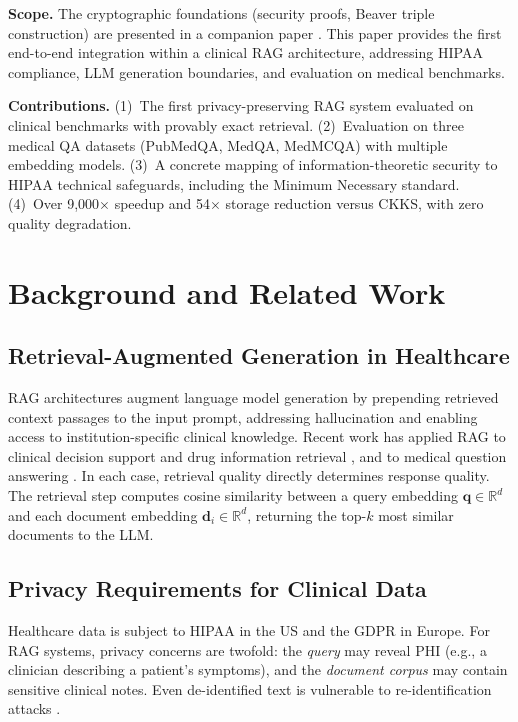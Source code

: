 \documentclass[conference]{IEEEtran}
\newcommand{\R}{\mathbb{R}}
\newcommand{\query}{\mathbf{q}}
\newcommand{\doc}{\mathbf{d}}
\begin{document}
\smallskip
\noindent\textbf{Scope.}
The cryptographic foundations (security proofs, Beaver triple construction)
are presented in a companion paper \cite{syed2026rpb}. This paper
provides the first end-to-end integration within a clinical RAG architecture,
addressing HIPAA compliance, LLM generation boundaries, and evaluation on
medical benchmarks.

\smallskip
\noindent\textbf{Contributions.}
(1)~The first privacy-preserving RAG system evaluated on clinical benchmarks
with provably exact retrieval.
(2)~Evaluation on three medical QA datasets (PubMedQA, MedQA, MedMCQA)
with multiple embedding models.
(3)~A concrete mapping of information-theoretic security to HIPAA technical
safeguards, including the Minimum Necessary standard.
(4)~Over 9{,}000$\times$ speedup and 54$\times$ storage reduction versus
CKKS, with zero quality degradation.


\section{Background and Related Work}
\label{sec:background}

\subsection{Retrieval-Augmented Generation in Healthcare}
\label{sec:bg_rag}

RAG architectures \cite{lewis2020rag} augment language model generation by
prepending retrieved context passages to the input prompt, addressing
hallucination and enabling access to institution-specific clinical knowledge.
Recent work has applied RAG to clinical decision support and drug
information retrieval \cite{zakka2024almanac}, and to medical question
answering
\cite{xiong2024benchmarking_medical_rag}. In each case, retrieval quality
directly determines response quality.
The retrieval step computes cosine similarity between a query embedding
$\query \in \R^d$ and each document embedding $\doc_i \in \R^d$,
returning the top-$k$ most similar documents to the LLM.


\subsection{Privacy Requirements for Clinical Data}
\label{sec:bg_privacy}

Healthcare data is subject to HIPAA \cite{hipaa1996} in the US and the
GDPR \cite{gdpr2016} in Europe. For RAG systems, privacy concerns are
twofold: the \emph{query} may reveal PHI (e.g., a clinician describing a
patient's symptoms), and the \emph{document corpus} may contain sensitive
clinical notes. Even de-identified text is vulnerable to re-identification
attacks \cite{elemam2011reidentification}.
\end{document}
